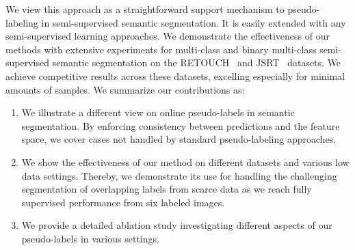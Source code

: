 \documentclass[letterpaper]{article} %
\begin{document}
We view this approach as a straightforward support mechanism to pseudo-labeling in semi-supervised semantic segmentation.
It is easily extended with any semi-supervised learning approaches.
We demonstrate the effectiveness of our methods with extensive experiments for multi-class and binary multi-class semi-supervised semantic segmentation on the RETOUCH~\cite{retouch} and JSRT~\cite{jsrt} datasets.
We achieve competitive results across these datasets, excelling especially for minimal amounts of samples.
We summarize our contributions as:
\begin{enumerate}
    \item We illustrate a different view on online pseudo-labels in semantic segmentation. By enforcing consistency between predictions and the feature space, we cover cases not handled by standard pseudo-labeling approaches. %
    \item We show the effectiveness of our method on different datasets and various low data settings. Thereby, we demonstrate its use for handling the challenging segmentation of overlapping labels from scarce data as we reach fully supervised performance from six labeled images.
    \item We provide a detailed ablation study investigating different aspects of our pseudo-labels in various settings.
\end{enumerate}
\end{document}
